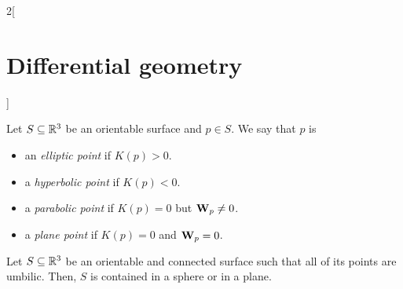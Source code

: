 \documentclass[../../../main.tex]{subfiles}
\begin{document}
\begin{multicols}{2}[\section{Differential geometry}]
\begin{definition}
    Let $S\subseteq\mathbb{R}^3$ be an orientable surface and $p\in S$. We say that $p$ is
    \begin{itemize}
      \item an \emph{elliptic point} if $K(p)>0$.
      \item a \emph{hyperbolic point} if $K(p)<0$.
      \item a \emph{parabolic point} if $K(p)=0$ but $\boldsymbol{\mathrm{W}}_p\ne0$.
      \item a \emph{plane point} if $K(p)=0$ and $\boldsymbol{\mathrm{W}}_p=0$.
    \end{itemize}
  \end{definition}
  \begin{proposition}
    Let $S\subseteq\mathbb{R}^3$ be an orientable and connected surface such that all of its points are umbilic. Then, $S$ is contained in a sphere or in a plane.
  \end{proposition}

\end{multicols}
\end{document}

